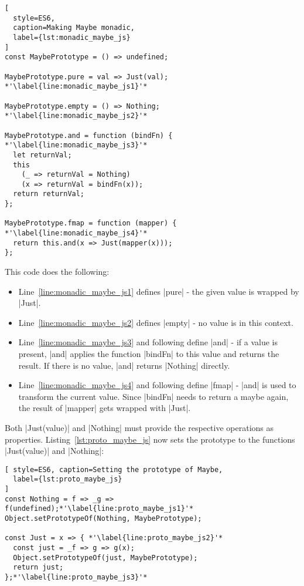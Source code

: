 \begin{lstlisting}[
  style=ES6,
  caption=Making Maybe monadic,
  label={lst:monadic_maybe_js}
]
const MaybePrototype = () => undefined;

MaybePrototype.pure = val => Just(val); *'\label{line:monadic_maybe_js1}'*

MaybePrototype.empty = () => Nothing; *'\label{line:monadic_maybe_js2}'*

MaybePrototype.and = function (bindFn) { *'\label{line:monadic_maybe_js3}'*
  let returnVal;
  this
    (_ => returnVal = Nothing)
    (x => returnVal = bindFn(x));
  return returnVal;
};

MaybePrototype.fmap = function (mapper) { *'\label{line:monadic_maybe_js4}'*
  return this.and(x => Just(mapper(x)));
};
\end{lstlisting}
This code does the following:
\begin{itemize}
  \item Line~\ref{line:monadic_maybe_js1} defines |pure| - the given value is
    wrapped by |Just|.
  \item Line~\ref{line:monadic_maybe_js2} defines |empty| - no value is in this
    context.
  \item Line~\ref{line:monadic_maybe_js3} and following define |and| - if a
    value is present, |and| applies the function |bindFn| to this value and
    returns the result. If there is no value, |and| returns |Nothing| directly.
  \item Line~\ref{line:monadic_maybe_js4} and following define |fmap| - |and|
    is used to transform the current value. Since |bindFn| needs to return a
    maybe again, the result of |mapper| gets wrapped with |Just|.
\end{itemize}

Both |Just(value)| and |Nothing| must provide the respective operations as
properties. Listing~\ref{lst:proto_maybe_js} now sets the prototype to the 
functions |Just(value)| and |Nothing|:

\begin{lstlisting}[ style=ES6, caption=Setting the prototype of Maybe,
  label={lst:proto_maybe_js}
]
const Nothing = f => _g => f(undefined);*'\label{line:proto_maybe_js1}'*
Object.setPrototypeOf(Nothing, MaybePrototype);

const Just = x => { *'\label{line:proto_maybe_js2}'*
  const just = _f => g => g(x);
  Object.setPrototypeOf(just, MaybePrototype);
  return just;
};*'\label{line:proto_maybe_js3}'*
\end{lstlisting}

